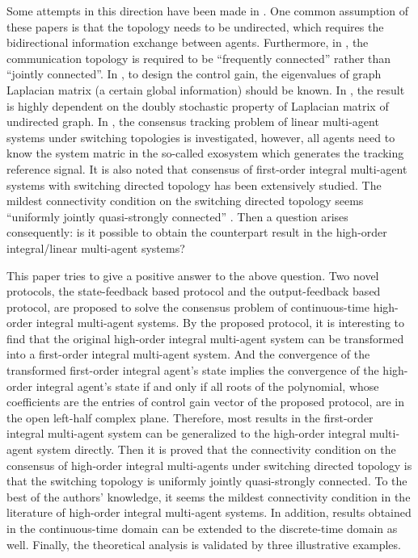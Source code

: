 \documentclass[12pt,draftcls,onecolumn]{IEEEtran}
\begin{document}
Some attempts in this direction have been made in \cite{Wang08AJC,Jiang10IJC,Ni10SCL,Xu13IET,Su12TAC,Su12Automatica,Su12TSMCB}. One common assumption of these papers is that the topology needs to be undirected,
which requires the bidirectional information exchange between agents.
Furthermore, in \cite{Wang08AJC}, the communication topology is required to be ``frequently connected'' rather than ``jointly connected''.
In \cite{Jiang10IJC,Ni10SCL,Xu13IET}, to design the control gain, the eigenvalues of graph Laplacian matrix (a certain global information) should be known.
In \cite{Su12TAC,Su12Automatica}, the result is highly dependent on the doubly stochastic property of Laplacian matrix of undirected graph. In \cite{Su12TSMCB}, the consensus tracking problem of linear multi-agent systems under switching topologies is investigated, however, all agents need to know the system matric in the so-called exosystem which generates the  tracking reference signal. 
It is also noted that consensus of first-order integral multi-agent systems with switching directed topology has been extensively studied.
The mildest connectivity condition on the switching directed topology seems ``uniformly jointly quasi-strongly connected'' \cite{Ren05TAC,Shi12arXiv}.
Then a question arises consequently: is it possible to obtain the counterpart result in the high-order integral/linear multi-agent systems?

This paper tries to give a positive answer to the above question. Two novel protocols, the state-feedback based protocol and the output-feedback based protocol, are proposed to solve the consensus problem of continuous-time high-order integral multi-agent systems. By the proposed protocol, it is interesting to find that the original high-order integral multi-agent system can be transformed into a first-order integral multi-agent system. And the convergence of the transformed first-order integral agent's state implies the convergence of the high-order integral agent's state if and only if all roots of the polynomial, whose coefficients are the entries of control gain vector of the proposed protocol, are in the open left-half complex plane. Therefore, most results in the first-order integral multi-agent system can be generalized to the high-order integral multi-agent system directly. Then it is proved that the connectivity condition on the consensus of high-order integral multi-agents under switching directed topology is that the switching topology is uniformly jointly quasi-strongly connected. To the best of the authors' knowledge, it seems the mildest connectivity condition in the literature of high-order integral multi-agent systems. In addition, results obtained in the continuous-time domain can be extended to the discrete-time domain as well. Finally, the theoretical analysis is validated by three illustrative examples.
\end{document}
